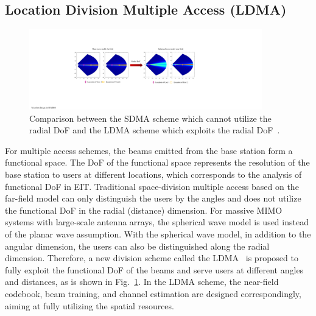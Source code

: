\documentclass[journal,twocolumn]{IEEEtran}
\begin{document}

\subsection{Location Division Multiple Access (LDMA)}
\begin{figure}[t]
	\centering 
	\includegraphics[width=0.9\textwidth]{figures/LDMA.pdf} 
	\caption{Comparison between the SDMA scheme which cannot utilize the radial DoF and the LDMA scheme which exploits the radial DoF~\cite{wu2022multiple}. }
	\label{fig:LDMA}
\end{figure}

For multiple access schemes, the beams emitted from the base station form a functional space. 
The DoF of the functional space represents the resolution of the base station to users at different locations, which corresponds to the analysis of functional DoF in EIT. 	%
Traditional space-division multiple access based on the far-field model can only distinguish the users by the angles and does not utilize the functional DoF in the radial (distance) dimension. 
For massive MIMO systems with large-scale antenna arrays, the spherical wave model is used instead of the planar wave assumption. 
With the spherical wave model, in addition to the angular dimension, the users can also be distinguished along the radial dimension. 
Therefore, a new division scheme called the LDMA~\cite{wu2022multiple} is proposed to fully exploit the functional DoF of the beams and serve users at different angles and distances, as is shown in Fig.~\ref{fig:LDMA}. 
In the LDMA scheme, the near-field codebook, beam training, and channel estimation are designed correspondingly, aiming at fully utilizing the spatial resources. 
\end{document}
